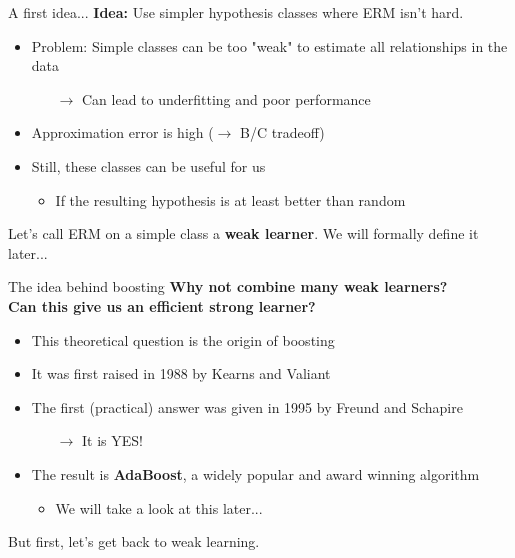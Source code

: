 \begin{frame}{A first idea...}
    \textbf{Idea:} Use simpler hypothesis classes where ERM isn't hard.

    \pause    
    
    \begin{itemize}
        \item Problem: Simple classes can be too "weak" to estimate all relationships in the data
        \begin{itemize}
            \item[$\rightarrow$] Can lead to underfitting and poor performance
        \end{itemize} \pause
        \item Approximation error is high ($\rightarrow$ B/C tradeoff) \pause
        \item Still, these classes can be useful for us
        \begin{itemize}
            \item If the resulting hypothesis is at least better than random
        \end{itemize}
    \end{itemize}

    \pause    
    
    Let's call ERM on a simple class a \textbf{weak learner}. We will formally define it later...
\end{frame}

\begin{frame}{The idea behind boosting}
    \textbf{Why not combine many weak learners?}\\
    \textbf{Can this give us an efficient strong learner?}
    
    \pause    
    
    \begin{itemize}
        \item This theoretical question is the origin of boosting \pause
        \item It was first raised in 1988 by Kearns and Valiant~\cite{kv-lbffahf-88} \pause
        \item The first (practical) answer was given in 1995 by Freund and Schapire~\cite{FREUND1997119}
        \begin{itemize}
            \item[$\rightarrow$] It is YES!
        \end{itemize} \pause
        \item The result is \textbf{AdaBoost}, a widely popular and award winning algorithm
        \begin{itemize}
            \item We will take a look at this later...
        \end{itemize}
    \end{itemize}

    \pause    
    
    But first, let's get back to weak learning.
\end{frame}
